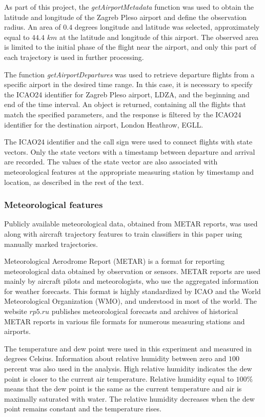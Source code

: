 \let\LaTeXcline\cline\documentclass[sn-mathphys-num]{sn-jnl}\let\cline\LaTeXcline
\begin{document}
As part of this project, the \textit{getAirportMetadata} function was used to obtain the latitude and longitude of the Zagreb Pleso airport and define the observation radius. An area of $0.4$ degrees longitude and latitude was selected, approximately equal to $44.4$ $km$ at the latitude and longitude of this airport. The observed area is limited to the initial phase of the flight near the airport, and only this part of each trajectory is used in further processing.

The function \textit{getAirportDepartures} was used to retrieve departure flights from a specific airport in the desired time range. In this case, it is necessary to specify the ICAO24 identifier for Zagreb Pleso airport, LDZA, and the beginning and end of the time interval. An object is returned, containing all the flights that match the specified parameters, and the response is filtered by the ICAO24 identifier for the destination airport, London Heathrow, EGLL.

The ICAO24 identifier and the call sign were used to connect flights with state vectors. Only the state vectors with a timestamp between departure and arrival are recorded. The values of the state vector are also associated with meteorological features at the appropriate measuring station by timestamp and location, as described in the rest of the text.

\subsubsection{Meteorological features}

Publicly available meteorological data, obtained from METAR reports, was used along with aircraft trajectory features to train classifiers in this paper using manually marked trajectories.

Meteorological Aerodrome Report (METAR) is a format for reporting meteorological data obtained by observation or sensors. METAR reports are used mainly by aircraft pilots and meteorologists, who use the aggregated information for weather forecasts. This format is highly standardized by ICAO and the World Meteorological Organization (WMO), and understood in most of the world. The website $rp5.ru$ \cite{rp5Description} publishes meteorological forecasts and archives of historical METAR reports in various file formats for numerous measuring stations and airports.

The temperature and dew point were used in this experiment and measured in degrees Celsius. Information about relative humidity between zero and $100$ percent was also used in the analysis. High relative humidity indicates the dew point is closer to the current air temperature. Relative humidity equal to $100\%$ means that the dew point is the same as the current temperature and air is maximally saturated with water. The relative humidity decreases when the dew point remains constant and the temperature rises.
\end{document}
